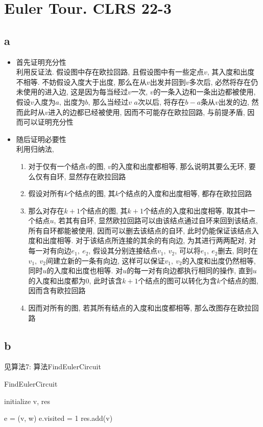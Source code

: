 \documentclass{article}
\begin{document}
\section{Euler Tour. CLRS 22-3}

\subsection{a}
\begin{itemize}
\item 首先证明充分性 \\
利用反证法. 假设图中存在欧拉回路, 且假设图中有一些定点$v$, 其入度和出度不相等. 不妨假设入度大于出度, 那么在从$v$出发并回到$v$多次后, 必然将存在仍未使用的进入边, 这是因为每当经过$v$一次, $v$的一条入边和一条出边都被使用, 假设$v$入度为$a$, 出度为$b$, 那么当经过$v$ $a$次以后, 将存在$b-a$条从$v$出发的边, 然而此时从$v$进入的边都已经被使用, 因而不可能存在欧拉回路, 与前提矛盾, 因而可以证明充分性
\item 随后证明必要性 \\
利用归纳法, 
\begin{enumerate}[1)]
\item 对于仅有一个结点$v$的图, $v$的入度和出度都相等, 那么说明其要么无环, 要么仅有自环, 显然存在欧拉回路
\item 假设对所有$k$个结点的图, 其$k$个结点的入度和出度相等, 都存在欧拉回路
\item 那么对存在$k+1$个结点的图, 其$k+1$个结点的入度和出度相等, 取其中一个结点$u$, 若其有自环, 显然欧拉回路可以由该结点通过自环来回到该结点, 所有自环都能被使用, 因而可以删去该结点的自环, 此时仍能保证该结点入度和出度相等. 对于该结点所连接的其余的有向边, 为其进行两两配对, 对每一对有向边$e_1,\ e_2$, 假设其分别连接结点$v_1,\ v_2$, 可以将$e_1,\ e_2$删去, 同时在$v_1,\ v_2$间建立新的一条有向边, 这样可以保证$v_1,\ v_2$的入度和出度仍然相等, 同时$u$的入度和出度也相等. 对$u$的每一对有向边都执行相同的操作, 直到$u$的入度和出度都为0, 此时该含$k+1$个结点的图可以转化为含$k$个结点的图, 因而含有欧拉回路
\item 因而对所有的图, 若其所有结点的入度和出度都相等, 那么改图存在欧拉回路
\end{enumerate}
\end{itemize}

\subsection{b}
见算法7: 算法FindEulerCircuit

\begin{algorithm}
\caption{FindEulerCircuit}
\begin{algorithmic}[1]
\State initialize v, res 
\State {}
\EndProcedure

\State e = (v, w)
\State e.visited = 1
\State {}
\EndIf
\EndFor
\State res.add(v)
\EndProcedure
\end{algorithmic}
\end{algorithm}
\end{document}
